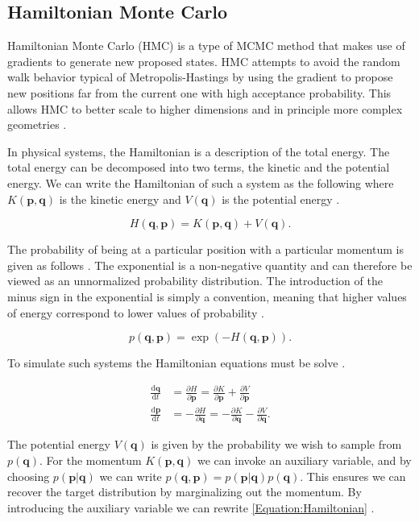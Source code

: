 \documentclass[../../../main.tex]{subfiles}
\begin{document}
\subsection{Hamiltonian Monte Carlo}

Hamiltonian Monte Carlo (HMC) is a type of MCMC method that makes use of gradients to generate new proposed states. HMC attempts to avoid the random walk behavior typical of Metropolis-Hastings by using the gradient to propose new positions far from the current one with high acceptance probability. This allows HMC to better scale to higher dimensions and in principle more complex geometries \autocite{Martin2021}.

In physical systems, the Hamiltonian is a description of the total energy. The total energy can be decomposed into two terms, the kinetic and the potential energy. We can write the Hamiltonian of such a system as the following where $K(\bm{p},\bm{q})$ is the kinetic energy and $V(\bm{q})$ is the potential energy \autocite{Martin2021}.

\begin{equation}\label{Equation:Hamiltonian}
H(\bm{q},\bm{p}) = K(\bm{p},\bm{q}) + V(\bm{q}).
\end{equation}

The probability of being at a particular position with a particular momentum is given as follows \autocite{Martin2021}. The exponential is a non-negative quantity and can therefore be viewed as an unnormalized probability distribution. The introduction of the minus sign in the exponential is simply a convention, meaning that higher values of energy correspond to lower values of probability \autocite{Bishop2023}.

\begin{equation}
p(\bm{q},\bm{p}) = \exp\left(-H(\bm{q},\bm{p})\right).
\end{equation}

To simulate such systems the Hamiltonian equations must be solve \autocite{Martin2021}.

\begin{align}
\frac{\mathrm{d}\bm{q}}{\mathrm{d}t} &= \frac{\partial H}{\partial \bm{p}} = \frac{\partial K}{\partial \bm{p}} + \frac{\partial V}{\partial \bm{p}} \\
\frac{\mathrm{d}\bm{p}}{\mathrm{d}t} &= -\frac{\partial H}{\partial \bm{q}} = -\frac{\partial K}{\partial \bm{q}} - \frac{\partial V}{\partial \bm{q}}.
\end{align}

The potential energy $V(\bm{q})$ is given by the probability we wish to sample from $p(\bm{q})$. For the momentum $K(\bm{p},\bm{q})$ we can invoke an auxiliary variable, and by choosing $p(\bm{p}|\bm{q})$ we can write $p(\bm{q},\bm{p}) = p(\bm{p}|\bm{q})p(\bm{q})$. This ensures we can recover the target distribution by marginalizing out the momentum. By introducing the auxiliary variable we can rewrite \autoref{Equation:Hamiltonian} \autocite{Martin2021}.
\end{document}
